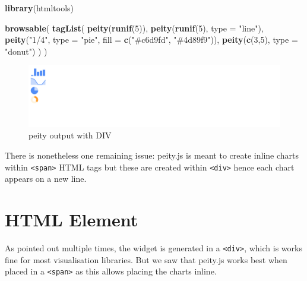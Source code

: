 \documentclass[
]{krantz}
\makeatletter
\newenvironment{Shaded}{\begin{snugshade}}{\end{snugshade}}
\newcommand{\DataTypeTok}[1]{\textcolor[rgb]{0.27,0.27,0.27}{#1}}
\newcommand{\DecValTok}[1]{\textcolor[rgb]{0.06,0.06,0.06}{#1}}
\newcommand{\KeywordTok}[1]{\textcolor[rgb]{0.27,0.27,0.27}{\textbf{#1}}}
\newcommand{\NormalTok}[1]{#1}
\newcommand{\StringTok}[1]{\textcolor[rgb]{0.5,0.5,0.5}{#1}}
\newenvironment{kframe}{%
\medskip{}
\setlength{\fboxsep}{.8em}
 \def\at@end@of@kframe{}%
 \ifinner\ifhmode%
  \def\at@end@of@kframe{\end{minipage}}%
  \begin{minipage}{\columnwidth}%
 \fi\fi%
 \def\FrameCommand##1{\hskip\@totalleftmargin \hskip-\fboxsep
 \colorbox{shadecolor}{##1}\hskip-\fboxsep
     \hskip-\linewidth \hskip-\@totalleftmargin \hskip\columnwidth}%
 \MakeFramed {\advance\hsize-\width
   \@totalleftmargin\z@ \linewidth\hsize
   \@setminipage}}%
 {\par\unskip\endMakeFramed%
 \at@end@of@kframe}
\renewenvironment{Shaded}{\begin{kframe}}{\end{kframe}}
\makeatother
\begin{document}
\begin{Shaded}
\begin{Highlighting}[]
\KeywordTok{library}\NormalTok{(htmltools)}

\KeywordTok{browsable}\NormalTok{(}
  \KeywordTok{tagList}\NormalTok{(}
    \KeywordTok{peity}\NormalTok{(}\KeywordTok{runif}\NormalTok{(}\DecValTok{5}\NormalTok{)),}
    \KeywordTok{peity}\NormalTok{(}\KeywordTok{runif}\NormalTok{(}\DecValTok{5}\NormalTok{), }\DataTypeTok{type =} \StringTok{"line"}\NormalTok{),}
    \KeywordTok{peity}\NormalTok{(}\StringTok{"1/4"}\NormalTok{, }\DataTypeTok{type =} \StringTok{"pie"}\NormalTok{, }\DataTypeTok{fill =} \KeywordTok{c}\NormalTok{(}\StringTok{"\#c6d9fd"}\NormalTok{, }\StringTok{"\#4d89f9"}\NormalTok{)),}
    \KeywordTok{peity}\NormalTok{(}\KeywordTok{c}\NormalTok{(}\DecValTok{3}\NormalTok{,}\DecValTok{5}\NormalTok{), }\DataTypeTok{type =} \StringTok{"donut"}\NormalTok{)}
\NormalTok{  )}
\NormalTok{)}
\end{Highlighting}
\end{Shaded}

\begin{figure}
\centering
\includegraphics{images/peity-div.png}
\caption{peity output with DIV}
\end{figure}

There is nonetheless one remaining issue: peity.js is meant to create inline charts within \texttt{\textless{}span\textgreater{}} HTML tags but these are created within \texttt{\textless{}div\textgreater{}} hence each chart appears on a new line.

\hypertarget{widgets-realistic-html-element}{%
\section{HTML Element}\label{widgets-realistic-html-element}}

As pointed out multiple times, the widget is generated in a \texttt{\textless{}div\textgreater{}}, which is works fine for most visualisation libraries. But we saw that peity.js works best when placed in a \texttt{\textless{}span\textgreater{}} as this allows placing the charts inline.
\end{document}
